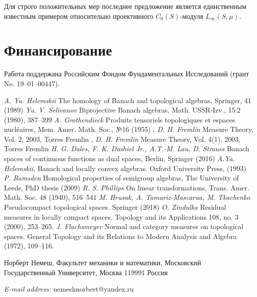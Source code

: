 \documentclass[12pt]{article}
\begin{document}
Для строго положительных мер последнее предложение является единственным
известным примером относительно проективного $C_0(S)$-модуля $L_\infty(S,\mu)$.

\section{Финансирование}\label{SectionFunding} Работа поддержана Российским
Фондом Фундаментальных Исследований (грант No. 19--01--00447).

\begin{thebibliography}{999}
    \textit{A. Ya. Helemskii} The homology of Banach and topological algebras,
    Springer, 41 (1989)
    \textit{Yu. V. Selivanov} Biprojective Banach algebras, Math. USSR-Izv.,
    15:2 (1980), 387–399
    \textit{A. Grothendieck} Produits tensoriels topologiques et espaces
    nucl{\'e}aires, Mem. Amer. Math. Soc., №16 (1955)
    , \textit{D. H. Fremlin} Measure Theory, Vol. 2,
    {2003}, Torres Fremlin
    , \textit{D. H. Fremlin} Measure Theory, Vol. 4(1),
    {2003}, Torres Fremlin
    \textit{H. G. Dales, F. K. Dashiel Jr., A.T.-M. Lau, D. Strauss} Banach
    spaces of continuous functions as dual spaces, Berlin, Springer (2016)
    \textit{A.Ya. Helemskii}, Banach and locally convex algebras. Oxford
    University Press, (1993)
    \textit{P. Ramsden} Homological properties of semigroup algebras, The
    University of Leeds, PhD thesis (2009)
    \textit{R. S. Phillips} On linear transformations, Trans. Amer. Math. Soc.
    48 (1940), 516--541
    \textit{M. Hrusak, A. Tamariz-Mascarua, M. Tkachenko} Pseudocompact
    topological spaces. Springer (2018)
    \textit{O. Zindulka} Residual measures in locally compact spaces. Topology
    and its Applications 108, no. 3 (2000), 253--265.
    \textit{J. Flachsmeyer} Normal and category measures on topological spaces.
    General Topology and its Relations to Modern Analysis and Algebra (1972),
    109--116.
\end{thebibliography}

Норберт Немеш, Факультет механики и математики, Московский Государственный
Университет, Москва 119991 Россия

\textit{E-mail address:} nemeshnorbert@yandex.ru
\end{document}
